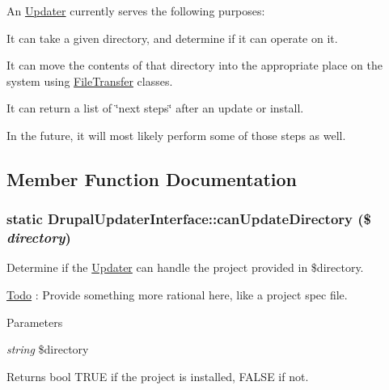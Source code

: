 An \hyperlink{classUpdater}{Updater} currently serves the following purposes:
\begin{DoxyItemize}
\item It can take a given directory, and determine if it can operate on it.
\item It can move the contents of that directory into the appropriate place on the system using \hyperlink{classFileTransfer}{FileTransfer} classes.
\item It can return a list of \char`\"{}next steps\char`\"{} after an update or install.
\item In the future, it will most likely perform some of those steps as well. 
\end{DoxyItemize}

\subsection{Member Function Documentation}
\hypertarget{interfaceDrupalUpdaterInterface_a3ff6c92f6ed593e03f5e36788ef2d2cc}{
\subsubsection[{canUpdateDirectory}]{\setlength{\rightskip}{0pt plus 5cm}static DrupalUpdaterInterface::canUpdateDirectory (\$ {\em directory})}}
\label{interfaceDrupalUpdaterInterface_a3ff6c92f6ed593e03f5e36788ef2d2cc}
Determine if the \hyperlink{classUpdater}{Updater} can handle the project provided in \$directory.

\begin{Desc}
\item[\hyperlink{todo__todo000008}{Todo}]: Provide something more rational here, like a project spec file.\end{Desc}

\begin{DoxyParams}{Parameters}
\item[{\em string}]\$directory\end{DoxyParams}
\begin{DoxyReturn}{Returns}
bool TRUE if the project is installed, FALSE if not. 
\end{DoxyReturn}



